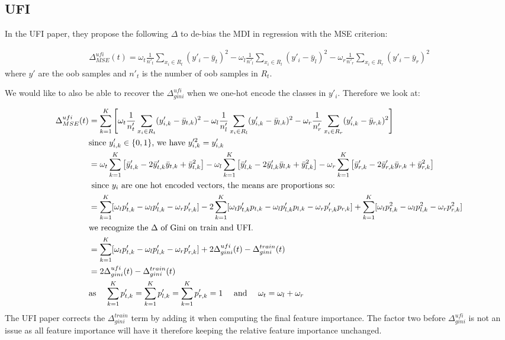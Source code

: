 \documentclass{article}
\begin{document}
\subsection{UFI}
In the UFI paper, they propose the following $\Delta$ to de-bias the MDI in regression with the MSE criterion:

\begin{align*}
    \Delta_{MSE}^{ufi}(t) = \omega_t \frac{1}{n'_t} \sum_{x_i \in R_t}(y'_i - \bar{y}_t)^2 - \omega_l \frac{1}{n'_l} \sum_{x_i \in R_l}(y'_i - \bar{y}_l)^2 - \omega_r \frac{1}{n'_r} \sum_{x_i \in R_r}(y'_i - \bar{y}_r)^2
\end{align*}
where $y'$ are the oob samples and $n'_t$ is the number of oob samples in $R_t$.

We would like to also be able to recover the $\Delta_{gini}^{ufi} $ when we one-hot encode the classes in $y'_i$. Therefore we look at:

\begin{align*}
    \Delta_{MSE}^{ufi}(t) &= \sum_{k=1}^K \left[\omega_t \frac{1}{n'_t} \sum_{x_i \in R_t}(y'_{i,k} - \bar{y}_{t,k})^2 - \omega_l \frac{1}{n'_l} \sum_{x_i \in R_l}(y'_{i,k} - \bar{y}_{l,k})^2 - \omega_r \frac{1}{n'_r} \sum_{x_i \in R_r}(y'_{i,k} - \bar{y}_{r,k})^2\right]\\
    & \text{since } y'_{i,k} \in \{0, 1\} \text{, we have } y^{\prime2}_{i,k} = y'_{i,k} \\
    &= \omega_t \sum_{k=1}^K \left[ \bar{y}'_{t,k} - 2\bar{y}'_{t,k}\bar{y}_{t,k} + \bar{y}^2_{t,k}\right] 
    - \omega_l \sum_{k=1}^K \left[ \bar{y}'_{l,k} - 2\bar{y}'_{l,k}\bar{y}_{l,k} + \bar{y}^2_{l,k}\right]
    - \omega_r \sum_{k=1}^K \left[ \bar{y}'_{r,k} - 2\bar{y}'_{r,k}\bar{y}_{r,k} + \bar{y}^2_{r,k}\right]\\
    & \text{ since $y_i$ are one hot encoded vectors, the means are proportions so:}\\
    &= \sum_{k=1}^K[\omega_t p'_{t,k} - \omega_l p'_{l,k} - \omega_r p'_{r,k}] -2 \sum_{k=1}^K [\omega_t p'_{t,k}p_{t,k} - \omega_l p'_{l,k}p_{l,k} - \omega_r p'_{r,k}p_{r,k}] + \sum_{k=1}^K[\omega_t p^2_{t,k} - \omega_l p^2_{l,k} - \omega_r p^2_{r,k}]\\
    & \text{we recognize the $\Delta$ of Gini on train and UFI.} \\
    &=\sum_{k=1}^K[\omega_t p'_{t,k} - \omega_l p'_{l,k} - \omega_r p'_{r,k}] + 2 \Delta_{gini}^{ufi}(t) - \Delta_{gini}^{train}(t) \\
    &= 2 \Delta_{gini}^{ufi}(t) - \Delta_{gini}^{train}(t) \\ 
    & \text{as \quad $\sum_{k=1}^K p'_{t,k} = \sum_{k=1}^K p'_{l,k} = \sum_{k=1}^K p'_{r,k} = 1$ \quad and \quad $\omega_t = \omega_l + \omega_r$}
\end{align*}
The UFI paper \cite{UFI} corrects the $\Delta_{gini}^{train}$ term by adding it when computing the final feature importance. The factor two before $\Delta_{gini}^{ufi}$ is not an issue as all feature importance will have it therefore keeping the relative feature importance unchanged. 
\end{document}

